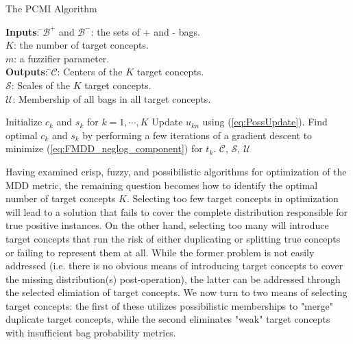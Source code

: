 \documentclass[12pt,dvips]{report}
\numberwithin{equation}{section}
\begin{document}
\begin{algorithm}
  \caption{The PCMI Algorithm}
  \label{alg:PCMI}
  {\begin{tabbing}
  \textbf{Inputs}: \=$\mathcal{B}^+$ and $\mathcal{B}^-$: the sets of + and - bags.\\
   \>$K$: the number of target concepts.\\
   \>$m$: a fuzzifier parameter.\\
   \textbf{Outputs}: \=$\mathcal{C}$: Centers of the $K$ target concepts.\\
     \>$\mathcal{S}$: Scales of the $K$ target concepts.\\
   \>$\mathcal{U}$: Membership of all bags in all target concepts.\\
   \end{tabbing}}
  \begin{algorithmic}
    \STATE Initialize $c_k$ and $s_k$ for $k=1, \cdots, K$
    \REPEAT 
       \STATE Update $u_{kn}$ using (\ref{eq:PossUpdate}).
       \STATE Find optimal $c_{k}$  and $s_{k}$ by performing a few iterations of a gradient descent to minimize (\ref{eq:FMDD_neglog_component}) for $t_{k}$. \ENDFOR
    \RETURN $\mathcal{C}$, $\mathcal{S}$, $\mathcal{U}$
  \end{algorithmic}
\end{algorithm}

Having examined crisp, fuzzy, and possibilistic algorithms for optimization of the MDD metric, the remaining question becomes how to identify the optimal number of target concepts $K$.  Selecting too few target concepts in optimization will lead to a solution that fails to cover the complete distribution responsible for true positive instances.  On the other hand, selecting too many will introduce target concepts that run the risk of either duplicating or splitting true concepts or failing to represent them at all.  While the former problem is not easily addressed (i.e. there is no obvious means of introducing target concepts to cover the missing distribution(s) post-operation), the latter can be addressed through the selected elimiation of target concepts.  We now turn to two means of selecting target concepts: the first of these utilizes possibilistic memberships to "merge" duplicate target concepts, while the second eliminates "weak" target concepts with insufficient bag probability metrics.
\end{document}
